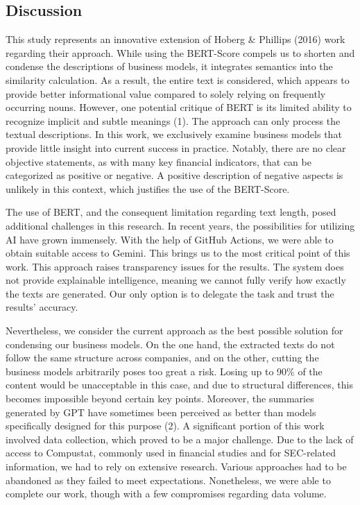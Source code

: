 \documentclass[
]{article}
\begin{document}
\newpage{}

\subsection{Discussion}\label{discussion}

This study represents an innovative extension of Hoberg \& Phillips
(2016) work regarding their approach. While using the BERT-Score compels
us to shorten and condense the descriptions of business models, it
integrates semantics into the similarity calculation. As a result, the
entire text is considered, which appears to provide better informational
value compared to solely relying on frequently occurring nouns. However,
one potential critique of BERT is its limited ability to recognize
implicit and subtle meanings (1). The approach can only process the
textual descriptions. In this work, we exclusively examine business
models that provide little insight into current success in practice.
Notably, there are no clear objective statements, as with many key
financial indicators, that can be categorized as positive or negative. A
positive description of negative aspects is unlikely in this context,
which justifies the use of the BERT-Score.

The use of BERT, and the consequent limitation regarding text length,
posed additional challenges in this research. In recent years, the
possibilities for utilizing AI have grown immensely. With the help of
GitHub Actions, we were able to obtain suitable access to Gemini. This
brings us to the most critical point of this work. This approach raises
transparency issues for the results. The system does not provide
explainable intelligence, meaning we cannot fully verify how exactly the
texts are generated. Our only option is to delegate the task and trust
the results' accuracy.

Nevertheless, we consider the current approach as the best possible
solution for condensing our business models. On the one hand, the
extracted texts do not follow the same structure across companies, and
on the other, cutting the business models arbitrarily poses too great a
risk. Losing up to 90\% of the content would be unacceptable in this
case, and due to structural differences, this becomes impossible beyond
certain key points. Moreover, the summaries generated by GPT have
sometimes been perceived as better than models specifically designed for
this purpose (2). A significant portion of this work involved data
collection, which proved to be a major challenge. Due to the lack of
access to Compustat, commonly used in financial studies and for
SEC-related information, we had to rely on extensive research. Various
approaches had to be abandoned as they failed to meet expectations.
Nonetheless, we were able to complete our work, though with a few
compromises regarding data volume.
\end{document}
